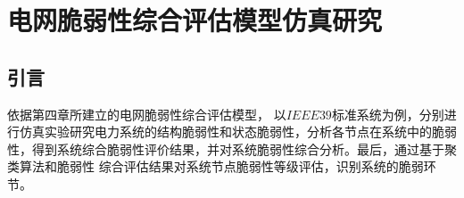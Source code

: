 \chapter{电网脆弱性综合评估模型仿真研究}
\label{cha:quantiAnaly}

\section{引言}
\label{sec:index5}
依据第四章所建立的电网脆弱性综合评估模型，
以$IEEE39$标准系统为例，分别进行仿真实验研究电力系统的结构脆弱性和状态脆弱性，分析各节点在系统中的脆弱性，得到系统综合脆弱性评价结果，并对系统脆弱性综合分析。最后，通过基于聚类算法和脆弱性
综合评估结果对系统节点脆弱性等级评估，识别系统的脆弱环节。




